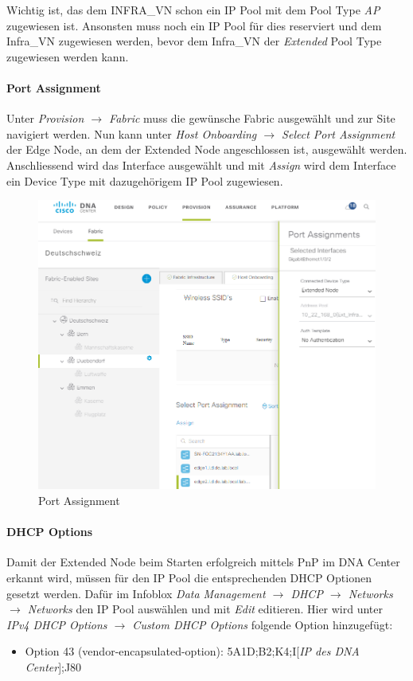 Wichtig ist, das dem INFRA\_VN schon ein IP Pool mit dem Pool Type \textit{AP} zugewiesen ist. Ansonsten muss noch ein IP Pool für dies reserviert und dem Infra\_VN zugewiesen werden, bevor dem Infra\_VN der \textit{Extended} Pool Type zugewiesen werden kann.

\paragraph{Port Assignment}
Unter \textit{Provision $\rightarrow$ Fabric} muss die gewünsche Fabric ausgewählt und zur Site navigiert werden. Nun kann unter \textit{Host Onboarding $\rightarrow$ Select Port Assignment} der Edge Node, an dem der Extended Node angeschlossen ist, ausgewählt werden. Anschliessend wird das Interface ausgewählt und mit \textit{Assign} wird dem Interface ein Device Type mit dazugehörigem IP Pool zugewiesen.

\begin{figure}[H]
	\centering
	\includegraphics[width=1\linewidth]{img/Absicherung/ExtendedNode3}
	\caption{Port Assignment}
	\label{fig:Port Assignment}
\end{figure}

\paragraph{DHCP Options}
Damit der Extended Node beim Starten erfolgreich mittels PnP im DNA Center erkannt wird, müssen für den IP Pool die entsprechenden DHCP Optionen gesetzt werden. Dafür im Infoblox \textit{Data Management $\rightarrow$ DHCP $\rightarrow$ Networks $\rightarrow$ Networks} den IP Pool auswählen und mit \textit{Edit} editieren. Hier wird unter \textit{IPv4 DHCP Options $\rightarrow$ Custom DHCP Options} folgende Option hinzugefügt:
\begin{itemize}
	\item Option 43 (vendor-encapsulated-option): 5A1D;B2;K4;I[\textit{IP des DNA Center}];J80
\end{itemize}


